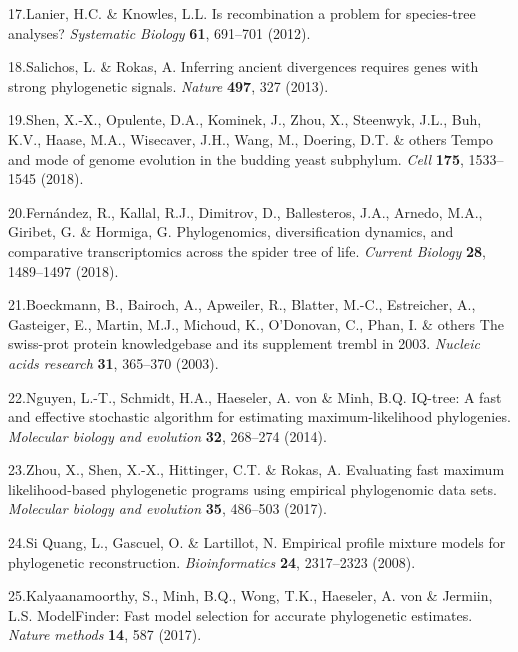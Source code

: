 \documentclass[]{article}
\begin{document}
\leavevmode\hypertarget{ref-lanier2012recombination}{}%
17.Lanier, H.C. \& Knowles, L.L. Is recombination a problem for
species-tree analyses? \emph{Systematic Biology} \textbf{61}, 691--701
(2012).

\leavevmode\hypertarget{ref-salichos2013inferring}{}%
18.Salichos, L. \& Rokas, A. Inferring ancient divergences requires
genes with strong phylogenetic signals. \emph{Nature} \textbf{497}, 327
(2013).

\leavevmode\hypertarget{ref-shen2018tempo}{}%
19.Shen, X.-X., Opulente, D.A., Kominek, J., Zhou, X., Steenwyk, J.L.,
Buh, K.V., Haase, M.A., Wisecaver, J.H., Wang, M., Doering, D.T. \&
others Tempo and mode of genome evolution in the budding yeast
subphylum. \emph{Cell} \textbf{175}, 1533--1545 (2018).

\leavevmode\hypertarget{ref-fernandez2018phylogenomics}{}%
20.Fernández, R., Kallal, R.J., Dimitrov, D., Ballesteros, J.A., Arnedo,
M.A., Giribet, G. \& Hormiga, G. Phylogenomics, diversification
dynamics, and comparative transcriptomics across the spider tree of
life. \emph{Current Biology} \textbf{28}, 1489--1497 (2018).

\leavevmode\hypertarget{ref-boeckmann2003swiss}{}%
21.Boeckmann, B., Bairoch, A., Apweiler, R., Blatter, M.-C., Estreicher,
A., Gasteiger, E., Martin, M.J., Michoud, K., O'Donovan, C., Phan, I. \&
others The swiss-prot protein knowledgebase and its supplement trembl in
2003. \emph{Nucleic acids research} \textbf{31}, 365--370 (2003).

\leavevmode\hypertarget{ref-nguyen2014iq}{}%
22.Nguyen, L.-T., Schmidt, H.A., Haeseler, A. von \& Minh, B.Q. IQ-tree:
A fast and effective stochastic algorithm for estimating
maximum-likelihood phylogenies. \emph{Molecular biology and evolution}
\textbf{32}, 268--274 (2014).

\leavevmode\hypertarget{ref-zhou2017evaluating}{}%
23.Zhou, X., Shen, X.-X., Hittinger, C.T. \& Rokas, A. Evaluating fast
maximum likelihood-based phylogenetic programs using empirical
phylogenomic data sets. \emph{Molecular biology and evolution}
\textbf{35}, 486--503 (2017).

\leavevmode\hypertarget{ref-si2008empirical}{}%
24.Si Quang, L., Gascuel, O. \& Lartillot, N. Empirical profile mixture
models for phylogenetic reconstruction. \emph{Bioinformatics}
\textbf{24}, 2317--2323 (2008).

\leavevmode\hypertarget{ref-kalyaanamoorthy2017modelfinder}{}%
25.Kalyaanamoorthy, S., Minh, B.Q., Wong, T.K., Haeseler, A. von \&
Jermiin, L.S. ModelFinder: Fast model selection for accurate
phylogenetic estimates. \emph{Nature methods} \textbf{14}, 587 (2017).
\end{document}

